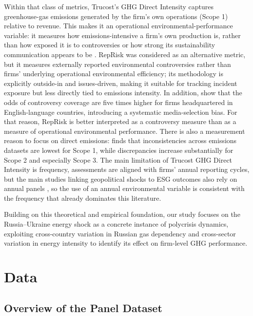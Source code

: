\documentclass[12pt,a4paper]{article}
\begin{document}
Within that class of metrics, Trucost's GHG Direct Intensity captures greenhouse-gas emissions generated by the firm's own operations (Scope 1) relative to revenue. This makes it an operational environmental-performance variable: it measures how emissions-intensive a firm's own production is, rather than how exposed it is to controversies or how strong its sustainability communication appears to be \citep{spglobal2025trucost, epa_scope1_scope2}. RepRisk was considered as an alternative metric, but it measures externally reported environmental controversies rather than firms' underlying operational environmental efficiency; its methodology is explicitly outside-in and issues-driven, making it suitable for tracking incident exposure but less directly tied to emissions intensity. In addition, \citet{barkemeyer2023} show that the odds of controversy coverage are five times higher for firms headquartered in English-language countries, introducing a systematic media-selection bias. For that reason, RepRisk is better interpreted as a controversy measure than as a measure of operational environmental performance. There is also a measurement reason to focus on direct emissions: \citet{ngfs2024ghg} finds that inconsistencies across emissions datasets are lowest for Scope 1, while discrepancies increase substantially for Scope 2 and especially Scope 3. The main limitation of Trucost GHG Direct Intensity is frequency, assessments are aligned with firms' annual reporting cycles, but the main studies linking geopolitical shocks to ESG outcomes also rely on annual panels \citep{abdullah2024, saharti2024, erzurumlu2025}, so the use of an annual environmental variable is consistent with the frequency that already dominates this literature.

Building on this theoretical and empirical foundation, our study focuses on the Russia--Ukraine energy shock as a concrete instance of polycrisis dynamics, exploiting cross-country variation in Russian gas dependency and cross-sector variation in energy intensity to identify its effect on firm-level GHG performance.


\section{Data}
\label{sec:data}

\subsection{Overview of the Panel Dataset}
\end{document}
